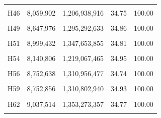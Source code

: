 \documentclass[
  a4paper,
  titlepage]{article}
\begin{document}
\begin{longtable}[t]{lllll}
\cellcolor{gray!6}{H45} & \cellcolor{gray!6}{9,433,246} & \cellcolor{gray!6}{1,412,686,257} & \cellcolor{gray!6}{34.83} & \cellcolor{gray!6}{100.00}\\
 
H46 & 8,059,902 & 1,206,938,916 & 34.75 & 100.00\\
 
\cellcolor{gray!6}{H47} & \cellcolor{gray!6}{9,245,140} & \cellcolor{gray!6}{1,384,656,039} & \cellcolor{gray!6}{34.77} & \cellcolor{gray!6}{100.00}\\
 
H49 & 8,647,976 & 1,295,292,633 & 34.86 & 100.00\\
 
\cellcolor{gray!6}{H50} & \cellcolor{gray!6}{9,209,082} & \cellcolor{gray!6}{1,379,348,066} & \cellcolor{gray!6}{34.22} & \cellcolor{gray!6}{100.00}\\
 
H51 & 8,999,432 & 1,347,653,855 & 34.81 & 100.00\\
 
\cellcolor{gray!6}{H52} & \cellcolor{gray!6}{9,971,156} & \cellcolor{gray!6}{1,493,435,918} & \cellcolor{gray!6}{34.57} & \cellcolor{gray!6}{100.00}\\
 
H54 & 8,140,806 & 1,219,067,465 & 34.95 & 100.00\\
 
\cellcolor{gray!6}{H55} & \cellcolor{gray!6}{11,373,972} & \cellcolor{gray!6}{1,703,591,590} & \cellcolor{gray!6}{34.92} & \cellcolor{gray!6}{100.00}\\
 
H56 & 8,752,638 & 1,310,956,477 & 34.74 & 100.00\\
 
\cellcolor{gray!6}{H58} & \cellcolor{gray!6}{7,937,916} & \cellcolor{gray!6}{1,188,802,333} & \cellcolor{gray!6}{34.55} & \cellcolor{gray!6}{100.00}\\
 
H59 & 8,752,856 & 1,310,802,940 & 34.93 & 100.00\\
 
\cellcolor{gray!6}{H61} & \cellcolor{gray!6}{7,701,034} & \cellcolor{gray!6}{1,153,218,387} & \cellcolor{gray!6}{34.85} & \cellcolor{gray!6}{100.00}\\
 
H62 & 9,037,514 & 1,353,273,357 & 34.77 & 100.00\\
 
\cellcolor{gray!6}{H63} & \cellcolor{gray!6}{9,694,688} & \cellcolor{gray!6}{1,452,103,613} & \cellcolor{gray!6}{34.62} & \cellcolor{gray!6}{100.00}\\
 

\end{longtable}
\end{document}
